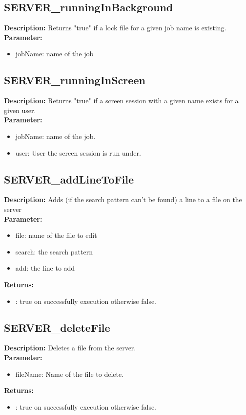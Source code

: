 \subsection{SERVER\_runningInBackground}
\textbf{Description:} Returns "true" if a lock file for a given job name is existing.\\
\textbf{Parameter:}
\begin{itemize}
\item jobName: name of the job
\end{itemize}

\subsection{SERVER\_runningInScreen}
\textbf{Description:} Returns "true" if a screen session with a given name exists for a given user.\\
\textbf{Parameter:}
\begin{itemize}
\item jobName: name of the job.
\item user: User the screen session is run under.
\end{itemize}

\subsection{SERVER\_addLineToFile}
\textbf{Description:} Adds (if the search pattern can't be found) a line to a file on the server\\
\textbf{Parameter:}
\begin{itemize}
\item file: name of the file to edit
\item search: the search pattern
\item add: the line to add
\end{itemize}
\textbf{Returns:}
\begin{itemize}
\item : true on successfully execution otherwise false.
\end{itemize}

\subsection{SERVER\_deleteFile}
\textbf{Description:} Deletes a file from the server.\\
\textbf{Parameter:}
\begin{itemize}
\item fileName: Name of the file to delete.
\end{itemize}
\textbf{Returns:}
\begin{itemize}
\item : true on successfully execution otherwise false.
\end{itemize}

